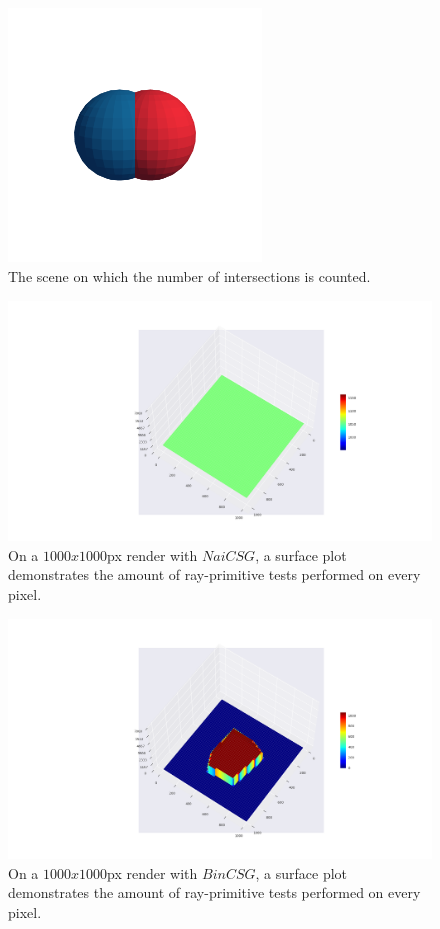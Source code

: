 \documentclass[a4paper,11pt,oneside]{article}
\begin{document}
\begin{figure}[H]
	\centering
	\includegraphics[width=0.6\textwidth]{section5/plots/union.png}
	\caption{The scene on which the number of intersections is counted.}
	\label{sec5.1:test_count_render}
\end{figure}

\begin{figure}[H]
	\centering
	\includegraphics[width=\textwidth]{section5/plots/surface_naive_union.png}
	\caption{On a $1000x1000$px render with $NaiCSG$, a surface plot demonstrates the amount of ray-primitive tests performed on every pixel.}
	\label{sec5.1:test_count_naive}
\end{figure}

\begin{figure}[H]
	\centering
	\includegraphics[width=\textwidth]{section5/plots/surface_bin_union.png}
	\caption{On a $1000x1000$px render with $BinCSG$, a surface plot demonstrates the amount of ray-primitive tests performed on every pixel.}
	\label{sec5.1:test_count_bin}
\end{figure}
\end{document}
